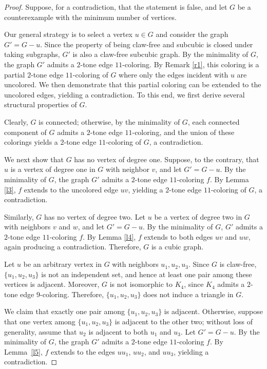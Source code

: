 \documentclass[12pt]{article}
\theoremstyle{plain}
\numberwithin{theorem}{section}
\numberwithin{conjecture}{section}
\numberwithin{corollary}{section}
\numberwithin{example}{section}
\numberwithin{lemma}{section}
\numberwithin{proposition}{section}
\numberwithin{problem}{section}
\numberwithin{remark}{section}
\numberwithin{claim}{theorem}
\numberwithin{definition}{section}
\begin{document}
\begin{proof}
Suppose, for a contradiction, that the statement is false, and let $G$ be a counterexample with the minimum number of vertices.

\noindent Our general strategy is to select a vertex $u \in G$ and consider the graph $G' = G - u$. Since the property of being claw-free and subcubic is closed under taking subgraphs, $G'$ is also a claw-free subcubic graph. By the minimality of $G$, the graph $G'$ admits a $2$-tone edge $11$-coloring. By Remark \ref{r1}, this coloring is a partial $2$-tone edge $11$-coloring of $G$ where only the edges incident with $u$ are uncolored. We then demonstrate that this partial coloring can be extended to the uncolored edges, yielding a contradiction. To this end, we first derive several structural properties of $G$.

\noindent Clearly, $G$ is connected; otherwise, by the minimality of $G$, each connected component of $G$ admits a $2$-tone edge $11$-coloring, and the union of these colorings yields a $2$-tone edge $11$-coloring of $G$, a contradiction.

\noindent We next show that $G$ has no vertex of degree one. Suppose, to the contrary, that $u$ is a vertex of degree one in $G$ with neighbor $v$, and let $G' = G - u$. By the minimality of $G$, the graph $G'$ admits a $2$-tone edge $11$-coloring $f$. By Lemma \ref{l3}, $f$ extends to the uncolored edge $uv$, yielding a $2$-tone edge $11$-coloring of $G$, a contradiction.

\noindent Similarly, $G$ has no vertex of degree two. Let $u$ be a vertex of degree two in $G$ with neighbors $v$ and $w$, and let $G' = G - u$. By the minimality of $G$, $G'$ admits a $2$-tone edge $11$-coloring $f$. By Lemma \ref{l4}, $f$ extends to both edges $uv$ and $uw$, again producing a contradiction. Therefore, $G$ is a cubic graph.

\noindent Let $u$ be an arbitrary vertex in $G$ with neighbors $u_1,u_2,u_3$. Since $G$ is claw-free, $\{u_1,u_2,u_3\}$ is not an independent set, and hence at least one pair among these vertices is adjacent. Moreover, $G$ is not isomorphic to $K_4$, since $K_4$ admits a $2$-tone edge $9$-coloring. Therefore, $\{u_1,u_2,u_3\}$ does not induce a triangle in $G$.

\noindent We claim that exactly one pair among $\{u_1,u_2,u_3\}$ is adjacent. Otherwise, suppose that one vertex among $\{u_1,u_2,u_3\}$ is adjacent to the other two; without loss of generality, assume that $u_2$ is adjacent to both $u_1$ and $u_3$. Let $G'=G-u$. By the minimality of $G$, the graph $G'$ admits a $2$-tone edge $11$-coloring $f$. By Lemma~\ref{l5}, $f$ extends to the edges $uu_1$, $uu_2$, and $uu_3$, yielding a contradiction.


\end{proof}
\end{document}
